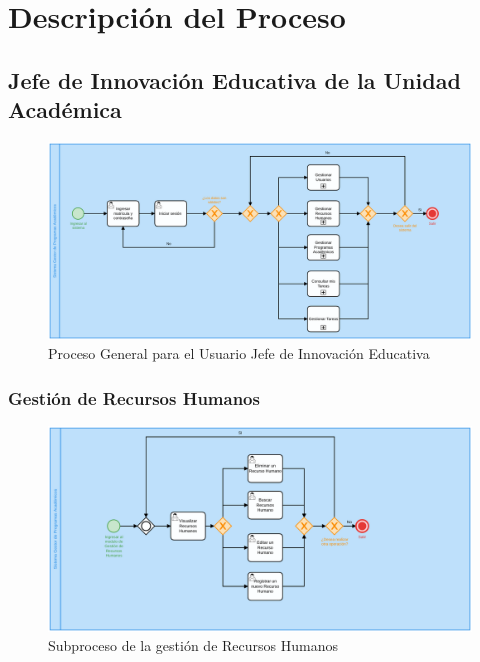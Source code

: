 \chapter{Descripción del Proceso}
        \section{Jefe de Innovación Educativa de la Unidad Académica}
        \begin{figure}[!hbtp]
        	\centering
        	\hypertarget{BPMNG}{\includegraphics[width=\linewidth]{images/SP1/ProcesoGeneral}
        	\caption{Proceso General para el Usuario Jefe de Innovación Educativa}}
        	\label{BPMNG}
        \end{figure}
        \newpage
    	\subsection{Gestión de Recursos Humanos}

        \begin{figure}[!hbtp]
        	\centering
        	\hypertarget{BPMNGRH}{\includegraphics[width=\linewidth]{images/SP1/gestionRH.png}}
        	\caption{Subproceso de la gestión de Recursos Humanos}
        	\label{BPMNGRH}
        \end{figure}


